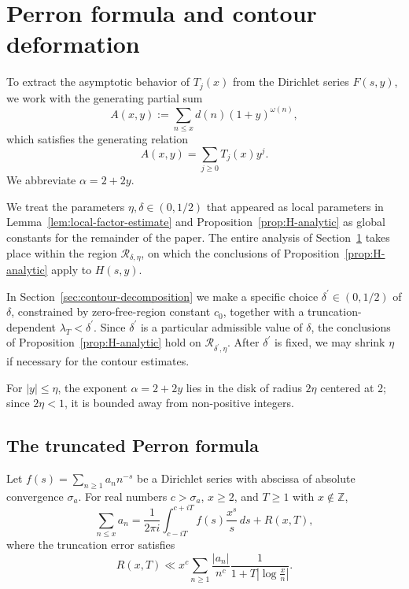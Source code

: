 \section{Perron formula and contour deformation}\label{sec:perron}

To extract the asymptotic behavior of $T_j(x)$ from the Dirichlet
series $F(s, y)$, we work with the generating partial sum
\begin{equation}\label{eq:Axy-def}
    A(x, y) := \sum_{n \leq x} d(n) (1 + y)^{\omega(n)},
\end{equation}
which satisfies the generating relation
\begin{equation}\label{eq:Axy-generating}
    A(x, y) = \sum_{j \geq 0} T_j(x) y^j.
\end{equation}
We abbreviate $\alpha=2+2y$.

We treat the parameters $\eta, \delta \in (0,1/2)$ that appeared as local parameters in Lemma~\ref{lem:local-factor-estimate} and Proposition~\ref{prop:H-analytic} as global constants for the remainder of the paper. The entire analysis of Section~\ref{sec:perron} takes place within the region $\mathcal{R_{\delta, \eta}}$, on which the conclusions of Proposition~\ref{prop:H-analytic} apply to $H(s,y)$.

In Section~\ref{sec:contour-decomposition} we make a specific choice $\delta^{\prime} \in (0,1/2)$ of $\delta$, constrained by zero-free-region constant $c_0$, together with a truncation-dependent $\lambda_T < \delta^{\prime}$. Since $\delta^{\prime}$ is a particular admissible value of $\delta$, the conclusions of Proposition~\ref{prop:H-analytic} hold on $\mathcal{R}_{\delta^{\prime}, \eta}$. After $\delta^{\prime}$ is fixed, we may shrink $\eta$ if necessary for the contour estimates.

For $|y| \leq \eta$, the exponent $\alpha = 2+2y$ lies in the disk of radius $2\eta$ centered at 2; since $2\eta < 1$, it is bounded away from non-positive integers. 

\subsection{The truncated Perron formula}\label{sec:perron-formula}

\begin{theorem}\label{thm:perron}
Let $f(s) = \sum_{n \geq 1} a_n n^{-s}$ be a Dirichlet series with
abscissa of absolute convergence $\sigma_a$. For real numbers
$c > \sigma_a$, $x \geq 2$, and $T \geq 1$ with $x \notin \mathbb{Z}$,
\begin{equation}\label{eq:perron}
    \sum_{n \leq x} a_n
    = \frac{1}{2\pi i} \int_{c - iT}^{c + iT} f(s) \frac{x^s}{s} \, ds
    + R(x, T),
\end{equation}
where the truncation error satisfies
\begin{equation}\label{eq:perron-error}
    R(x, T) \ll
    x^c \sum_{n \geq 1} \frac{|a_n|}{n^c}
    \frac{1}{1 + T \left|\log \frac{x}{n}\right|}.
\end{equation}
\end{theorem}

